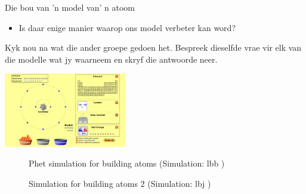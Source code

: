 \begin{groupdiscussion}{Die bou van 'n model van' n atoom}
\begin{multicols}{2}
\begin{itemize}[noitemsep]
\label{m38741*uid119}\item Is daar enige manier waarop ons model verbeter kan word?
\end{itemize}
        \label{m38741*id260596}Kyk nou na wat die ander groepe gedoen het. Bespreek dieselfde vrae vir elk van die modelle wat jy waarneem en skryf die antwoorde neer. \par 
\end{multicols}
\begin{center}
 \includegraphics[width=0.4\textwidth]{photos/BuildAtom.png}
\end{center}

\end{groupdiscussion}      
    \setcounter{subfigure}{0}
	\begin{figure}[H] %
    \textnormal{Phet simulation for building atoms} \nopagebreak
  \label{m38806*phet!!!underscore!!!sim}\label{m38806*phet-simulation}
             { (Simulation:  lbb )}
 \end{figure}       
\par 
    \setcounter{subfigure}{0}
	\begin{figure}[H] %
    \textnormal{Simulation for building atoms 2} \nopagebreak
  \label{m38806*phet!!!underscore!!!sim}\label{m38806*phet-simulation}
             { (Simulation:  lbj )}
 \end{figure}       
    \par 
    \label{m38741*cid10}
